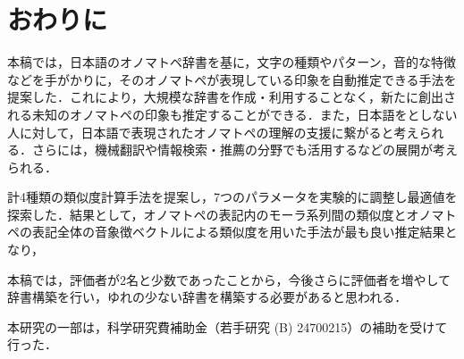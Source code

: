 \documentclass[japanese]{jnlp_1.4}
\newcommand{\addtext}[1]{}
\begin{document}
\section{おわりに}

本稿では，日本語のオノマトペ辞書を基に，文字の種類やパターン，音的な特徴などを手がかりに，そのオノマトペが表現している印象を自動推定できる手法を提案した．これにより，大規模な辞書を作成・利用することなく，新たに創出される未知のオノマトペの印象も推定することができる．また，日本語を\addtext{母語}としない人に対して，日本語で表現されたオノマトペの理解の支援に繋がると考えられる．さらには，機械翻訳や情報検索・推薦の分野でも活用するなどの展開が考えられる．

計4種類の類似度計算手法を提案し，7つのパラメータを実験的に調整し最適値を探索した．結果として，オノマトペの表記内のモーラ系列間の類似度とオノマトペの表記全体の音象徴ベクトルによる類似度を用いた手法が最も良い推定結果となり，\addtext{参考値である人間同士の一致率の8割程度にまで近づくことができた．}

本稿では，評価者が2名と少数であったことから，今後さらに評価者を増やして辞書構築を行い，ゆれの少ない辞書を構築する必要があると思われる．

\acknowledgment

本研究の一部は，科学研究費補助金（若手研究 (B) 24700215）の補助を受けて行った．
\end{document}
